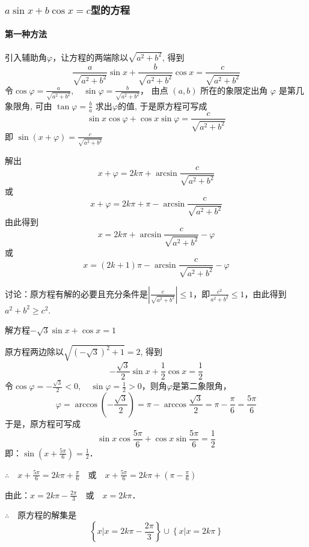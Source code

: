 \subsubsection{$a\sin x +b\cos x=c$型的方程}

\paragraph{第一种方法} 引入辅助角$\varphi$，让方程的两端除以$\sqrt{a^2+b^2}$, 得到
\[\frac{a}{\sqrt{a^{2}+b^{2}}} \sin x+\frac{b}{\sqrt{a^{2}+b^{2}}} \cos x=\frac{c}{\sqrt{a^{2}+b^{2}}}\]
令$\cos \varphi=\frac{a}{\sqrt{a^{2}+b^{2}}}, \quad \sin \varphi=\frac{b}{\sqrt{a^{2}+b^{2}}}$，
由点 $(a, b)$ 所在的象限定出角 $\varphi$ 是第几象限角, 可由 
$\tan \varphi=\frac{b}{a}$ 求出$\varphi$的值, 于是原方程可写成
\[\sin x \cos \varphi+\cos x \sin \varphi=\frac{c}{\sqrt{a^{2}+b^{2}}}\]
即 $\sin (x+\varphi)=\frac{c}{\sqrt{a^{2}+b^{2}}}$

解出 
\begin{equation}
    x+\varphi=2 k \pi+\arcsin \frac{c}{\sqrt{a^{2}+b^{2}}}
\end{equation}
或
\begin{equation}
    x+\varphi=2 k \pi+\pi-\arcsin \frac{c}{\sqrt{a^{2}+b^{2}}}
\end{equation}
由此得到
\[x=2 k \pi+\arcsin \frac{c}{\sqrt{a^{2}+b^{2}}}-\varphi\]
或
\[x=(2 k+1) \pi-\arcsin \frac{c}{\sqrt{a^{2}+b^{2}}}-\varphi\]

讨论：原方程有解的必要且充分条件是$\left| \frac{c}{\sqrt{a^{2}+b^{2}}}\right|\le 1$，即$\frac{c^2}{a^2+b^2}\le 1$，由此得到
$a^2+b^2\ge c^2$.

\begin{example}
    解方程$-\sqrt{3}\sin x+\cos x=1$
\end{example}

\begin{solution}
    原方程两边除以$\sqrt{(-\sqrt{3})^2+1}=2$, 得到
\[-\frac{\sqrt{3}}{2}\sin x+\frac{1}{2}\cos x=\frac{1}{2}\]
令$\cos\varphi=-\frac{\sqrt{3}}{2}<0,\quad \sin\varphi=\frac{1}{2}>0$，则角$\varphi$是第二象限角，
\[\varphi=\arccos\left(-\frac{\sqrt{3}}{2}\right)=\pi-\arccos\frac{\sqrt{3}}{2}=\pi-\frac{\pi}{6}=\frac{5\pi}{6}\]
于是，原方程可写成
\[\sin x\cos\frac{5\pi}{6}+\cos x\sin \frac{5\pi}{6}=\frac{1}{2}\]
即：$\sin\left(x+\frac{5\pi}{6}\right)=\frac{1}{2}$．

$\therefore\quad x+\frac{5\pi}{6}=2k\pi+\frac{\pi}{6}\quad \text{或}\quad x+\frac{5\pi}{6}=2k\pi+\left(\pi-\frac{\pi}{6}\right)$

由此：$x=2k\pi-\frac{2\pi}{3}\quad \text{或}\quad x=2k\pi$．

$\therefore\quad $原方程的解集是
\[\left\{x\big|x=2k\pi-\frac{2\pi}{3}\right\}\cup \left\{x\big|x=2k\pi\right\}\]
\end{solution}

